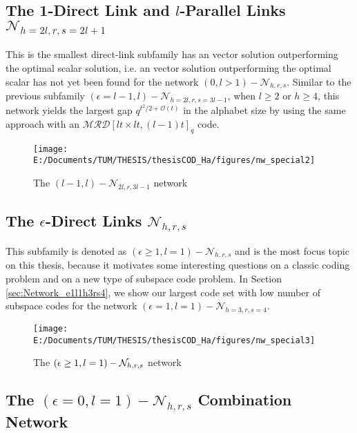 \subsection{The 1-Direct Link and $l$-Parallel Links $\mathcal{N}_{h=2l,r,s=2l+1}$}

This is the smallest direct-link subfamily has an vector solution
outperforming the optimal scalar solution, i.e. an vector solution
outperforming the optimal scalar has not yet been found for the network
$(0,l>1)-\mathcal{N}_{h,r,s}$. Similar to the previous subfamily
$\left(\epsilon=l-1,l\right)-\mathcal{N}_{h=2l,r,s=3l-1}$, when $l\geq2$
or $h\geq4$, this network yields the largest gap $q^{t^{2}/2+\mathcal{O}(t)}$
in the alphabet size by using the same approach with an $\mathcal{MRD}\left[lt\times lt,(l-1)t\right]_{q}$
code. 

\begin{figure}[H]
\caption{The $\left(l-1,l\right)-\mathcal{N}_{2l,r,3l-1}$ network \label{fig:network_special2}}

\texttt{[image: E:/Documents/TUM/THESIS/thesisCOD\_Ha/figures/nw\_special2]}
\end{figure}


\subsection{The $\epsilon$-Direct Links $\mathcal{N}_{h,r,s}$}

This subfamily is denoted as $\left(\epsilon\geq1,l=1\right)-\mathcal{N}_{h,r,s}$
and is the most focus topic on this thesis, because it motivates some
interesting questions on a classic coding problem and on a new type
of subspace code problem. In Section \ref{sec:Network_e1l1h3rs4},
we show our largest code set with low number of subspace codes for
the network $\left(\epsilon=1,l=1\right)-\mathcal{N}_{h=3,r,s=4}$.

\begin{figure}[H]
\caption{The $\left(\epsilon\protect\geq1,l=1\right)-\mathcal{N}_{h,r,s}$
network \label{fig:network_special3}}

\texttt{[image: E:/Documents/TUM/THESIS/thesisCOD\_Ha/figures/nw\_special3]}
\end{figure}


\subsection{The $\left(\epsilon=0,l=1\right)-\mathcal{N}_{h,r,s}$ Combination
Network}

